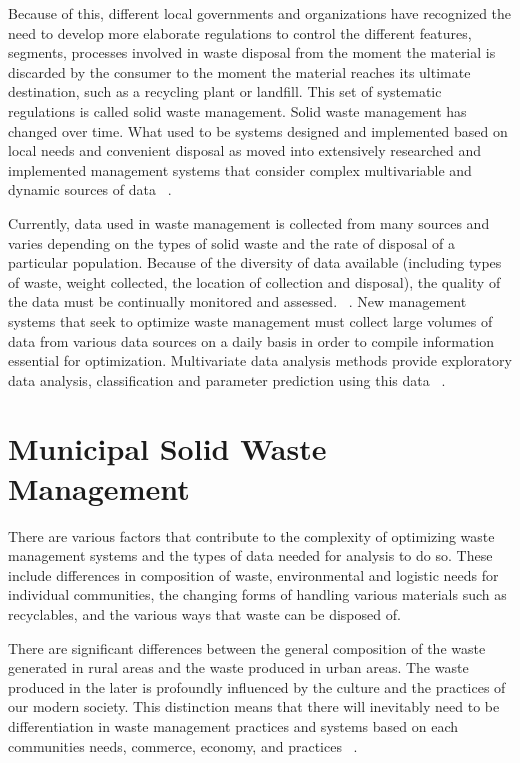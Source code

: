 \documentclass[sigconf]{acmart}
\begin{document}
Because of this, different local governments and organizations have recognized the need to develop more elaborate regulations to control the different features, segments, processes involved in waste disposal from the moment the material is discarded by the consumer to the moment the material reaches its ultimate destination, such as a recycling plant or landfill. This set of systematic regulations is called solid waste management. Solid waste management has changed over time.  What used to be systems designed and implemented based on local needs and convenient disposal as moved into extensively researched and implemented management systems that consider complex multivariable and dynamic sources of data ~\cite{akbarpour2016}.

Currently, data used in waste management is collected from many sources and varies depending on the types of solid waste and the rate of disposal of a particular population. Because of the diversity of data available (including types of waste, weight collected, the location of collection and disposal), the quality of the data must be continually monitored and assessed. ~\cite{chandrappa2012}. New management systems that seek to optimize waste management must collect large volumes of data from various data sources on a daily basis in order to compile information essential for optimization.  Multivariate data analysis methods provide exploratory data analysis, classification and parameter prediction using this data ~\cite{bohm2013}. 

\section{ Municipal Solid Waste Management}

There are various factors that contribute to the complexity of optimizing waste management systems and the types of data needed for analysis to do so.  These include differences in composition of waste, environmental and logistic needs for individual communities, the changing forms of handling various materials such as recyclables, and the various ways that waste can be disposed of.  

There are significant differences between the general composition of the waste generated in rural areas and the waste produced in urban areas. The waste produced in the later is profoundly influenced by the culture and the practices of our modern society.  This distinction means that there will inevitably need to be differentiation in waste management practices and systems based on each communities needs, commerce, economy, and practices ~\cite{chandrappa2012}.
\end{document}
